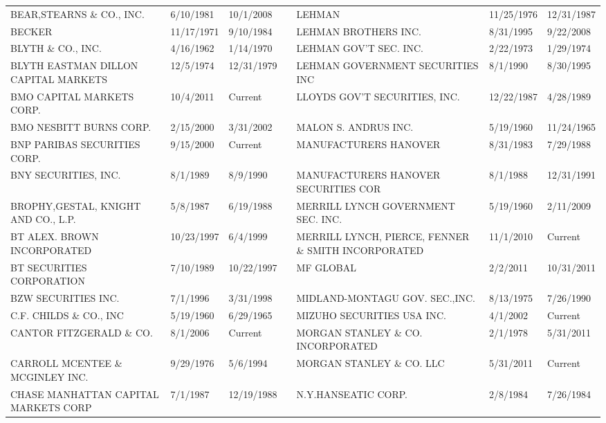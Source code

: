 \begin{tabular}{lllllll}
BEAR,STEARNS \& CO., INC.            & 6/10/1981 & 10/1/2008 &  & LEHMAN                               & 11/25/1976 & 12/31/1987 \\
BECKER                               & 11/17/1971 & 9/10/1984 &  & LEHMAN BROTHERS INC.                 & 8/31/1995 & 9/22/2008 \\
BLYTH \& CO., INC.                    & 4/16/1962 & 1/14/1970 &  & LEHMAN GOV'T SEC. INC.               & 2/22/1973 & 1/29/1974 \\
BLYTH EASTMAN DILLON CAPITAL MARKETS & 12/5/1974 & 12/31/1979 &  & LEHMAN GOVERNMENT SECURITIES INC     & 8/1/1990 & 8/30/1995 \\
BMO CAPITAL MARKETS CORP.  & 10/4/2011 & Current &  & LLOYDS GOV'T SECURITIES, INC.       & 12/22/1987 & 4/28/1989 \\
BMO NESBITT BURNS CORP.             & 2/15/2000 & 3/31/2002 &  & MALON S. ANDRUS INC.                 & 5/19/1960 & 11/24/1965 \\
BNP PARIBAS SECURITIES CORP.         & 9/15/2000 & Current &  & MANUFACTURERS HANOVER                & 8/31/1983 & 7/29/1988 \\
BNY SECURITIES, INC.                 & 8/1/1989 & 8/9/1990 &  & MANUFACTURERS HANOVER SECURITIES COR & 8/1/1988 & 12/31/1991 \\
BROPHY,GESTAL, KNIGHT AND CO., L.P. & 5/8/1987 & 6/19/1988 &  & MERRILL LYNCH GOVERNMENT SEC. INC.  & 5/19/1960 & 2/11/2009 \\
BT ALEX. BROWN INCORPORATED          & 10/23/1997 & 6/4/1999 &  & MERRILL LYNCH, PIERCE, FENNER \& SMITH INCORPORATED & 11/1/2010 & Current \\
BT SECURITIES CORPORATION            & 7/10/1989 & 10/22/1997 &  & MF GLOBAL  & 2/2/2011 & 10/31/2011 \\
BZW SECURITIES INC.                  & 7/1/1996 & 3/31/1998 &  & MIDLAND-MONTAGU GOV. SEC.,INC.  & 8/13/1975 & 7/26/1990 \\
C.F. CHILDS \& CO., INC               & 5/19/1960 & 6/29/1965 &  & MIZUHO SECURITIES USA INC.          & 4/1/2002 & Current \\
CANTOR FITZGERALD \& CO. & 8/1/2006 & Current &  & MORGAN STANLEY \& CO. INCORPORATED   & 2/1/1978 & 5/31/2011 \\
CARROLL MCENTEE \& MCGINLEY INC.      & 9/29/1976 & 5/6/1994 &  & MORGAN STANLEY \& CO. LLC & 5/31/2011 & Current \\
CHASE MANHATTAN CAPITAL MARKETS CORP & 7/1/1987 & 12/19/1988 &  & N.Y.HANSEATIC CORP.             & 2/8/1984 & 7/26/1984 \\

\end{tabular}
